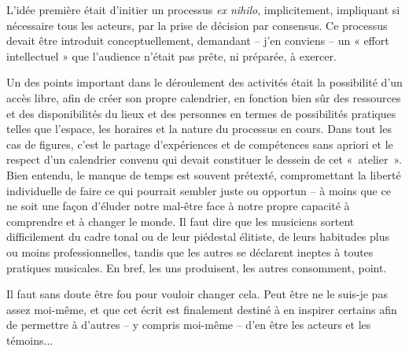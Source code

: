L'idée première était d'initier un processus \textit{ex nihilo}, implicitement, impliquant si nécessaire tous les acteurs, par la prise de décision par consensus.  Ce processus devait être introduit conceptuellement, demandant  -- j'en conviens -- un « effort intellectuel » que l'audience n'était pas prête, ni préparée, à exercer. 

Un des points important dans le déroulement des activités était la possibilité d’un accès libre, afin de créer son propre calendrier, en fonction bien sûr des ressources et des disponibilités du lieux et des personnes en termes de possibilités pratiques telles que l’espace, les horaires et la nature du processus en cours. Dans tout les cas de figures, c’est le partage d’expériences et de compétences sans apriori et le respect d'un calendrier convenu qui devait constituer le dessein de cet \hbox{« atelier »}. Bien entendu, le manque de temps est souvent prétexté, compromettant la liberté individuelle de faire ce qui pourrait sembler juste ou opportun -- à moins que ce ne soit une façon d'éluder notre mal-être face à notre propre capacité à comprendre et à changer le monde.
Il faut dire que les musiciens sortent difficilement du cadre tonal ou de leur piédestal élitiste, de leurs habitudes plus ou moins professionnelles, tandis que les autres se déclarent ineptes à toutes pratiques musicales. En bref, les uns produisent, les autres consomment, point. 

Il faut sans doute être fou pour vouloir changer cela. Peut être ne le suis-je pas assez moi-même, et que cet écrit est finalement destiné à en inspirer certains afin de permettre à d'autres -- y compris moi-même -- d'en être les acteurs et les témoins...

